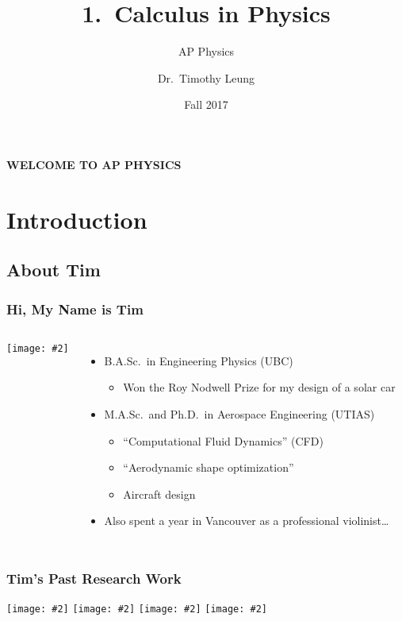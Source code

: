 \documentclass[12pt,compress,aspectratio=169]{beamer}
\title{1.\ Calculus in Physics}
\subtitle{AP Physics}
\author[TML]{Dr.\ Timothy Leung}
\institute{Olympiads School}
\date{Fall 2017}
\newcommand{\pic}[2]{\texttt{[image: \#2]}}
\begin{document}
\begin{frame}
  \frametitle{}
  {\LARGE
    \begin{center}
      \textbf{WELCOME TO AP PHYSICS}
    \end{center}
  }
\end{frame}

\section[Intro]{Introduction}

\subsection[Tim]{About Tim}
\begin{frame}
  \frametitle{Hi, My Name is Tim}
  \begin{columns}
    \pic{1}{tim.jpg}
    \begin{itemize}
    \item B.A.Sc.\ in Engineering Physics (UBC)
      \begin{itemize}
      \item Won the Roy Nodwell Prize for my design of a solar car
      \end{itemize}
    \item M.A.Sc.\ and Ph.D.\ in Aerospace Engineering (UTIAS)
      \begin{itemize}
      \item ``Computational Fluid Dynamics'' (CFD)
      \item ``Aerodynamic shape optimization''
      \item Aircraft design
      \end{itemize}
    \item Also spent a year in Vancouver as a professional violinist\ldots
    \end{itemize}
  \end{columns}
\end{frame}

\begin{frame}
  \frametitle{Tim's Past Research Work}
  \begin{center}
    \pic{0.25}{view-grid-original-1024x899.jpg}\hspace{0.01in}
    \pic{0.25}{view-grid-final-1024x899.jpg}\hspace{0.01in}
    \pic{0.225}{flowsolution-original-1024x1000.jpg}\hspace{0.01in}
    \pic{0.225}{flowsolution-deformed-1024x1000.jpg}
  \end{center}
\end{frame}
\end{document}

